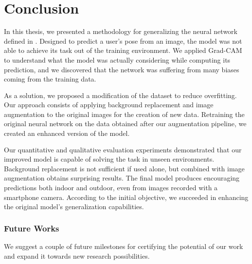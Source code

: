 \chapter{Conclusion}
\label{chap:conclusion}
 

In this thesis, we presented a methodology for generalizing the neural network defined in \cite{mantegazza2019visionbased}. Designed to predict a user's pose from an image, the model was not able to achieve its task out of the training environment. We applied Grad-CAM to understand what the model was actually considering while computing its prediction, and we discovered that the network was suffering from many biases coming from the training data.

As a solution, we proposed a modification of the dataset to reduce overfitting. Our approach consists of applying background replacement and image augmentation to the original images for the creation of new data. Retraining the original neural network on the data obtained after our augmentation pipeline, we created an enhanced version of the model.

Our quantitative and qualitative evaluation experiments demonstrated that our improved model is capable of solving the task in unseen environments. Background replacement is not sufficient if used alone, but combined with image augmentation obtains surprising results. The final model produces encouraging predictions both indoor and outdoor, even from images recorded with a smartphone camera. According to the initial objective, we succeeded in enhancing the original model's generalization capabilities.


\subsection*{Future Works}
\label{subsec:future-works}

We suggest a couple of future milestones for certifying the potential of our work and expand it towards new research possibilities.

